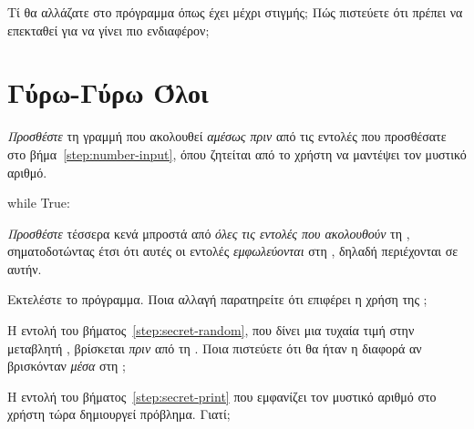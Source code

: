 \documentclass[a4paper,11pt,oneside]{book}
\begin{document}
\begin{step}
Τί θα αλλάζατε στο πρόγραμμα όπως έχει μέχρι στιγμής; Πώς πιστεύετε ότι πρέπει να επεκταθεί για να γίνει πιο ενδιαφέρον;

\marginnote[14pt]{\icondiscuss}
\dottedline

\dottedline
\end{step}

\section{Γύρω-Γύρω Όλοι}

\begin{step}
\emph{Προσθέστε} τη γραμμή που ακολουθεί \emph{αμέσως πριν} από τις εντολές που προσθέσατε στο βήμα~\ref{step:number-input}, όπου ζητείται από το χρήστη να μαντέψει τον μυστικό αριθμό.

\begin{pynew}
while True:
\end{pynew}

\emph{Προσθέστε} τέσσερα κενά μπροστά από \emph{όλες τις εντολές που ακολουθούν} τη , σηματοδοτώντας έτσι ότι αυτές οι εντολές \emph{εμφωλεύονται} στη , δηλαδή περιέχονται σε αυτήν.

Εκτελέστε το πρόγραμμα. Ποια αλλαγή παρατηρείτε ότι επιφέρει η χρήση της ;

\marginnote[14pt]{\icondiscuss}
\dottedline

\dottedline

Η εντολή του βήματος~\ref{step:secret-random}, που δίνει μια τυχαία τιμή στην μεταβλητή , βρίσκεται \emph{πριν} από τη . Ποια πιστεύετε ότι θα ήταν η διαφορά αν βρισκόνταν \emph{μέσα} στη ;

\marginnote[14pt]{\icondiscuss}
\dottedline

\dottedline

\label{step:secret-print-remove}
Η εντολή του βήματος~\ref{step:secret-print} που εμφανίζει τον μυστικό αριθμό στο χρήστη τώρα δημιουργεί πρόβλημα. Γιατί;

\marginnote[14pt]{\icondiscuss}
\dottedline

\dottedline


\end{step}
\end{document}
